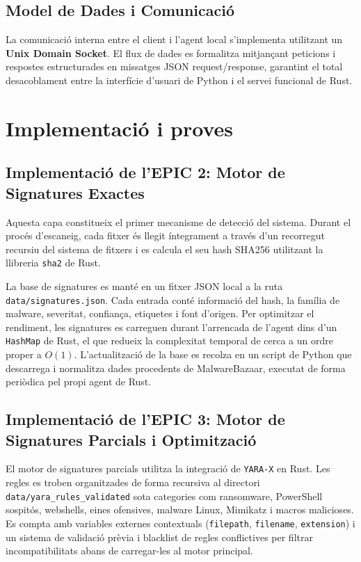 \documentclass[12pt,a4paper]{report}
\begin{document}
\section{Model de Dades i Comunicació}
La comunicació interna entre el client i l'agent local s'implementa utilitzant un \textbf{Unix Domain Socket}. El flux de dades es formalitza mitjançant peticions i respostes estructurades en missatges JSON request/response, garantint el total desacoblament entre la interfície d'usuari de Python i el servei funcional de Rust.


\chapter{Implementació i proves}
\label{ch:implementacioproves}

\section{Implementació de l'EPIC 2: Motor de Signatures Exactes}
Aquesta capa constitueix el primer mecanisme de detecció del sistema. Durant el procés d'escaneig, cada fitxer és llegit íntegrament a través d'un recorregut recursiu del sistema de fitxers i es calcula el seu hash SHA256 utilitzant la llibreria \texttt{sha2} de Rust. 

La base de signatures es manté en un fitxer JSON local a la ruta \texttt{data/signatures.json}. Cada entrada conté informació del hash, la família de malware, severitat, confiança, etiquetes i font d'origen. Per optimitzar el rendiment, les signatures es carreguen durant l'arrencada de l'agent dins d'un \texttt{HashMap} de Rust, el que redueix la complexitat temporal de cerca a un ordre proper a $O(1)$. L'actualització de la base es recolza en un script de Python que descarrega i normalitza dades procedents de MalwareBazaar, executat de forma periòdica pel propi agent de Rust.

\section{Implementació de l'EPIC 3: Motor de Signatures Parcials i Optimització}
El motor de signatures parcials utilitza la integració de \texttt{YARA-X} en Rust. Les regles es troben organitzades de forma recursiva al directori \texttt{data/yara\_rules\_validated} sota categories com ransomware, PowerShell sospitós, webshells, eines ofensives, malware Linux, Mimikatz i macros malicioses. Es compta amb variables externes contextuals (\texttt{filepath}, \texttt{filename}, \texttt{extension}) i un sistema de validació prèvia i blacklist de regles conflictives per filtrar incompatibilitats abans de carregar-les al motor principal.
\end{document}
